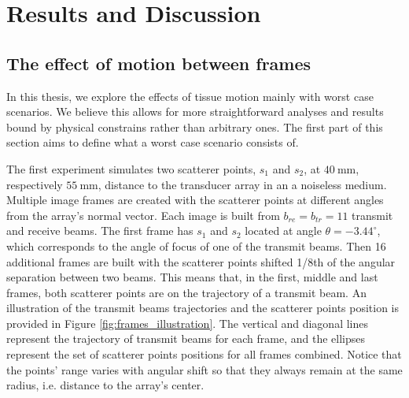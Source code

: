\chapter{Results and Discussion}
\label{chap:results}
\section{The effect of motion between frames}
\label{sec:res_frames_motion}
In this thesis, we explore the effects of tissue motion mainly with worst case scenarios. We believe this allows for more straightforward analyses and results bound by physical constrains rather than arbitrary ones.
The first part of this section aims to define what a worst case scenario consists of.

The first experiment simulates two scatterer points, $s_1$ and $s_2$, at $40~$mm, respectively $55~$mm, distance to the transducer array in an a noiseless medium. Multiple image frames are created with the scatterer points at different angles from the array's normal vector. Each image is built from $b_{re} = b_{tr} = 11$ transmit and receive beams. The first frame has $s_1$ and $s_2$ located at angle $\theta = -3.44^\circ$, which corresponds to the angle of focus of one of the transmit beams. Then 16 additional frames are built with the scatterer points shifted 1/8th of the angular separation between two beams. This means that, in the first, middle and last frames, both scatterer points are on the trajectory of a transmit beam. An illustration of the transmit beams trajectories and the scatterer points position is provided in Figure \ref{fig:frames_illustration}. The vertical and diagonal lines represent the trajectory of transmit beams for each frame, and the ellipses represent the set of scatterer points positions for all frames combined.
Notice that the points' range varies with angular shift so that they always remain at the same radius, i.e. distance to the array's center.

